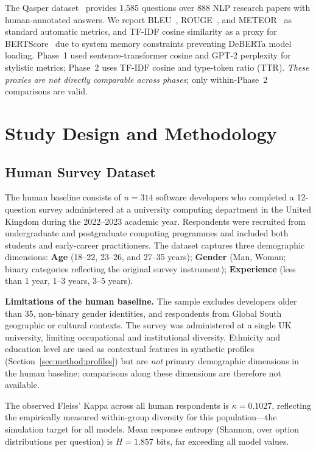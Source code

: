 \documentclass[12pt,a4paper]{article}
\begin{document}
The Qasper dataset~\cite{dasigi2021} provides 1,585 questions over 888
NLP research papers with human-annotated answers.
We report BLEU~\cite{papineni2002}, ROUGE~\cite{lin2004}, and
METEOR~\cite{banerjee2005} as standard automatic metrics, and TF-IDF
cosine similarity as a proxy for BERTScore~\cite{zhang2019} due to
system memory constraints preventing DeBERTa model loading.
Phase~1 used sentence-transformer cosine and GPT-2 perplexity for
stylistic metrics; Phase~2 uses TF-IDF cosine and type-token ratio
(TTR). \emph{These proxies are not directly comparable across phases};
only within-Phase~2 comparisons are valid.

\section{Study Design and Methodology}
\label{sec:method}

\subsection{Human Survey Dataset}
\label{sec:method:human}

The human baseline consists of $n{=}314$ software developers who
completed a 12-question survey administered at a university computing
department in the United Kingdom during the 2022--2023 academic year.
Respondents were recruited from undergraduate and postgraduate computing
programmes and included both students and early-career practitioners.
The dataset captures three demographic dimensions:
\textbf{Age} (18--22, 23--26, and 27--35 years);
\textbf{Gender} (Man, Woman; binary categories reflecting the original
survey instrument);
\textbf{Experience} (less than 1 year, 1--3 years, 3--5 years).

\textbf{Limitations of the human baseline.}
The sample excludes developers older than 35, non-binary gender
identities, and respondents from Global South geographic or cultural
contexts.
The survey was administered at a single UK university, limiting
occupational and institutional diversity.
Ethnicity and education level are used as contextual features in
synthetic profiles (Section~\ref{sec:method:profiles}) but are
\emph{not} primary demographic dimensions in the human baseline;
comparisons along these dimensions are therefore not available.

The observed Fleiss' Kappa across all human respondents is
$\kappa{=}0.1027$, reflecting the empirically measured within-group
diversity for this population---the simulation target for all models.
Mean response entropy (Shannon, over option distributions per question)
is $H{=}1.857$ bits, far exceeding all model values.
\end{document}
